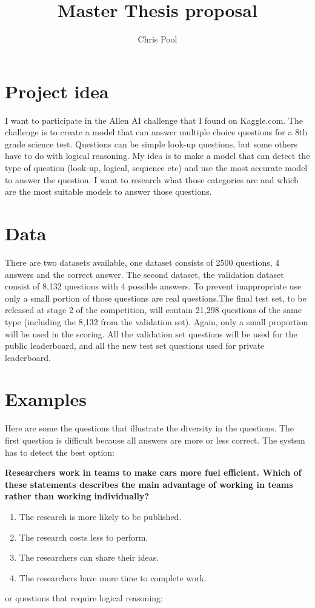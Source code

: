 \documentclass[11pt]{amsart}
\title{Master Thesis proposal}
\author{Chris Pool}
\begin{document}
\nocite{*}
\maketitle
\section{Project idea}
I want to participate in the Allen AI challenge that I found on Kaggle.com. The challenge is to create a model that can answer multiple choice questions for a 8th grade science test.  Questions can be simple look-up questions, but some others have to do with logical reasoning. My idea is to make a model that can detect the type of question (look-up, logical, sequence etc) and use the most accurate model to answer the question. I want to research what those categories are and which are the most suitable models to answer those questions.


\section{Data}
There are two datasets available, one dataset consists of 2500 questions, 4 answers and the correct answer. The second dataset, the validation dataset consist of 8,132 questions with 4 possible answers. To prevent inappropriate use only a small portion of those questions are real questions.The final test set, to be released at stage 2 of the competition, will contain 21,298 questions of the same type (including the 8,132 from the validation set). Again, only a small proportion will be used in the scoring. All the validation set questions will be used for the public leaderboard, and all the new test set questions used for private leaderboard.


\section{Examples}
Here are some the questions that illustrate the diversity in the questions. The first question is difficult because all answers are more or less correct. The system has to detect the best option: 
\vspace{5mm}

\noindent \textbf{Researchers work in teams to make cars more fuel efficient. Which of these statements describes the main advantage of working in teams rather than working individually?}
\begin{enumerate}[a]
\item The research is more likely to be published.
\item The research costs less to perform.
\item The researchers can share their ideas.
\item The researchers have more time to complete work.
\end{enumerate}
\vspace{5mm}
or questions that require logical reasoning:
\end{document}
